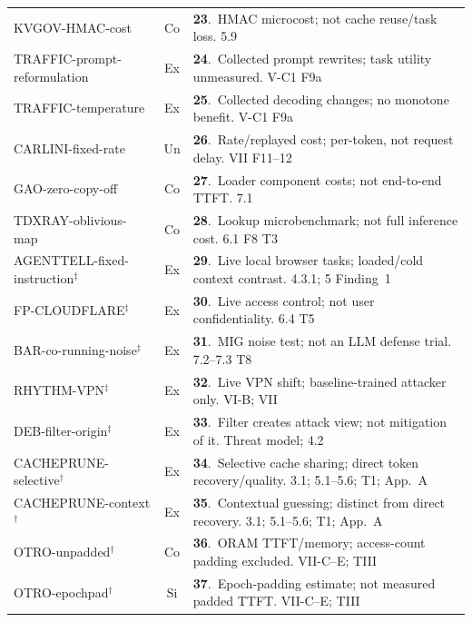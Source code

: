 \begin{table}[p]
\begin{minipage}[t]{0.495\textwidth}
\begin{tabularx}{\linewidth}{@{}p{.36\linewidth}cY@{}}
\textsf{KVGOV-HMAC-cost}~\cite{addagada2026kvgov} & Co & \textbf{23}.~HMAC microcost; not cache reuse/task loss. 5.9\\
\textsf{TRAFFIC-prompt-reformulation}~\cite{pouryousef2026traffic} & Ex & \textbf{24}.~Collected prompt rewrites; task utility unmeasured. V-C1 F9a\\
\textsf{TRAFFIC-temperature}~\cite{pouryousef2026traffic} & Ex & \textbf{25}.~Collected decoding changes; no monotone benefit. V-C1 F9a\\
\textsf{CARLINI-fixed-rate}~\cite{carlini2024remote} & Un & \textbf{26}.~Rate/replayed cost; per-token, not request delay. VII F11--12\\
\textsf{GAO-zero-copy-off}~\cite{gao2025iknow} & Co & \textbf{27}.~Loader component costs; not end-to-end TTFT. 7.1\\
\textsf{TDXRAY-oblivious-map}~\cite{hornetz2026tdxray} & Co & \textbf{28}.~Lookup microbenchmark; not full inference cost. 6.1 F8 T3\\
\textsf{AGENTTELL-fixed-instruction}$^{\ddagger}$~\cite{shahriar2026agenttell} & Ex & \textbf{29}.~Live local browser tasks; loaded/cold context contrast. 4.3.1; 5 Finding~1\\
\textsf{FP-CLOUDFLARE}$^{\ddagger}$~\cite{wang2026fpagent} & Ex & \textbf{30}.~Live access control; not user confidentiality. 6.4 T5\\
\textsf{BAR-co-running-noise}$^{\ddagger}$~\cite{gu2026behindbars} & Ex & \textbf{31}.~MIG noise test; not an LLM defense trial. 7.2--7.3 T8\\
\textsf{RHYTHM-VPN}$^{\ddagger}$~\cite{alhazbi2025rhythm} & Ex & \textbf{32}.~Live VPN shift; baseline-trained attacker only. VI-B; VII\\
\textsf{DEB-filter-origin}$^{\ddagger}$~\cite{debenedetti2024privacy} & Ex & \textbf{33}.~Filter creates attack view; not mitigation of it. Threat model; 4.2\\
\textsf{CACHEPRUNE-selective}$^{\dagger}$~\cite{wu2026cacheprune} & Ex & \textbf{34}.~Selective cache sharing; direct token recovery/quality. 3.1; 5.1--5.6; T1; App.~A\\
\textsf{CACHEPRUNE-context}$^{\dagger}$~\cite{wu2026cacheprune} & Ex & \textbf{35}.~Contextual guessing; distinct from direct recovery. 3.1; 5.1--5.6; T1; App.~A\\
\textsf{OTRO-unpadded}$^{\dagger}$~\cite{lee2026otro} & Co & \textbf{36}.~ORAM TTFT/memory; access-count padding excluded. VII-C--E; TIII\\
\textsf{OTRO-epochpad}$^{\dagger}$~\cite{lee2026otro} & Si & \textbf{37}.~Epoch-padding estimate; not measured padded TTFT. VII-C--E; TIII\\

\end{tabularx}
\end{minipage}
\end{table}
